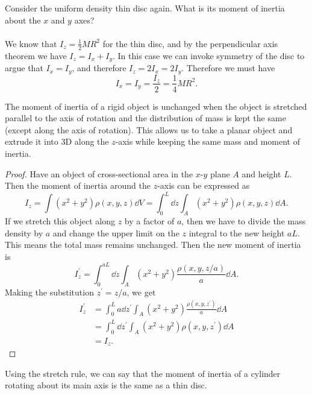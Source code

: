 \documentclass[../classical_mechanics.tex]{subfiles}
\begin{document}
        \begin{example}
            Consider the uniform density thin disc again.
            What is its moment of inertia about the $x$ and $y$ axes?

            \paragraph{}
            We know that $I_z=\frac{1}{2}MR^2$ for the thin disc, and by the perpendicular axis theorem we have $I_z=I_x+I_y$.
            In this case we can invoke symmetry of the disc to argue that $I_x=I_y$, and therefore $I_z=2I_x=2I_y$.
            Therefore we must have
            \begin{equation}
                I_x=I_y=\frac{I_z}{2}=\frac{1}{4}MR^2.
            \end{equation}
        \end{example}
        \begin{theorem}
            The moment of inertia of a rigid object is unchanged when the object is stretched parallel to the axis of rotation and the distribution of mass is kept the same (except along the axis of rotation).
            This allows us to take a planar object and extrude it into 3D along the $z$-axis while keeping the same mass and moment of inertia.
        \end{theorem}
        \begin{proof}
            Have an object of cross-sectional area in the $x$-$y$ plane $A$ and height $L$.
            Then the moment of inertia around the $z$-axis can be expressed as
            \begin{equation}
                I_z=\int(x^2+y^2)\rho(x,y,z)\dd{V}=\int_0^L\dd{z}\int_A(x^2+y^2)\rho(x,y,z)\dd{A}.
            \end{equation}
            If we stretch this object along $z$ by a factor of $a$, then we have to divide the mass density by $a$ and change the upper limit on the $z$ integral to the new height $aL$.
            This means the total mass remains unchanged.
            Then the new moment of inertia is
            \begin{equation}
                I_z^\prime=\int_0^{aL}\dd{z}\int_A(x^2+y^2)\frac{\rho(x,y,z/a)}{a}\dd{A}.
            \end{equation}
            Making the substitution $z^\prime=z/a$, we get
            \begin{align}
                I_z^\prime&=\int_0^L a\dd{z}^\prime\int_A(x^2+y^2)\frac{\rho(x,y,z^\prime)}{a}\dd{A}\\
                &=\int_0^L\dd{z}^\prime\int_A(x^2+y^2)\rho(x,y,z^\prime)\dd{A}\\
                &=I_z.
            \end{align}
        \end{proof}
        Using the stretch rule, we can say that the moment of inertia of a cylinder rotating about its main axis is the same as a thin disc.
\end{document}
